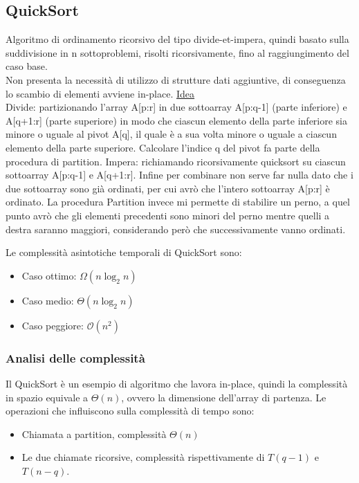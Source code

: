 \documentclass[a4paper, 11pt]{article}
\begin{document}
\subsection{QuickSort}
Algoritmo di ordinamento ricorsivo del tipo divide-et-impera, quindi basato sulla suddivisione in n sottoproblemi, risolti ricorsivamente, fino al raggiungimento del caso base.\\
Non presenta la necessità di utilizzo di strutture dati aggiuntive, di conseguenza lo scambio di elementi avviene in-place.\bigbreak
\noindent  \underline{Idea} \\ Divide: partizionando l'array A[p:r] in due sottoarray A[p:q-1] (parte inferiore) e A[q+1:r] (parte superiore) in modo che ciascun elemento della parte 
inferiore sia minore o uguale al pivot A[q], il quale è a sua volta minore o uguale a ciascun elemento della parte superiore. Calcolare l'indice q del pivot fa parte della procedura 
di partition. Impera: richiamando ricorsivamente quicksort su ciascun sottoarray A[p:q-1] e A[q+1:r]. Infine per combinare non serve far 
nulla dato che i due sottoarray sono già ordinati, per cui avrò che l'intero sottoarray A[p:r] è ordinato. 
La procedura Partition invece mi permette di stabilire un perno, a quel punto avrò che gli elementi precedenti sono minori del perno mentre quelli a destra saranno maggiori,
considerando però che successivamente vanno ordinati.\bigskip

\noindent Le complessità asintotiche temporali di QuickSort sono: 
\begin{itemize}
    \item Caso ottimo: $\Omega(n\log_2n)$
    \item Caso medio: $\Theta(n\log_2n)$
    \item Caso peggiore: $\mathcal{O}(n^2)$
\end{itemize}

\subsubsection{Analisi delle complessità}
Il QuickSort è un esempio di algoritmo che lavora in-place, quindi la complessità in spazio equivale a $\Theta(n)$, ovvero la dimensione dell'array di partenza.\bigbreak
\noindent Le operazioni che influiscono sulla complessità di tempo sono:
\begin{itemize}
    \item Chiamata a partition, complessità $\Theta(n)$
    \item Le due chiamate ricorsive, complessità rispettivamente di $T(q-1)$ e $T(n-q)$.
\end{itemize}
\end{document}
